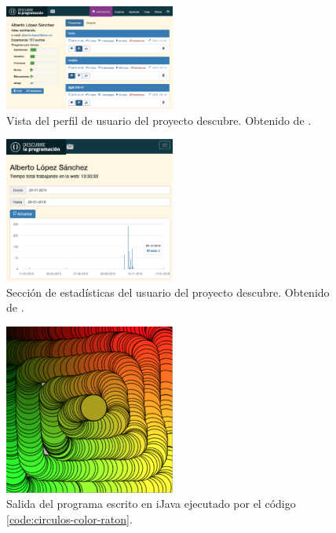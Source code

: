 \begin{figure}[!ht]
	\begin{centering}
		\includegraphics[width=0.5\textwidth]{images/descubre-profile.png}
				\caption{Vista del perfil de usuario del proyecto \Gls{descubre}. Obtenido de \cite{descubre}.}
				\label{fig:descubre-perfil}
	\end{centering}
\end{figure}


\begin{figure}[!ht]
	\begin{centering}
		\includegraphics[width=0.5\textwidth]{images/descubre-statistics.png}
				\caption{Sección de estadísticas del usuario del proyecto \Gls{descubre}. Obtenido de \cite{descubre}.}
				\label{fig:descubre-estadisticas}
	\end{centering}
\end{figure}


\begin{figure}[!ht]
	\begin{centering}
		\includegraphics[width=0.5\textwidth]{images/salida-code-circulos-color-raton.png}
			\caption{Salida del programa escrito en iJava ejecutado por el código \ref{code:circulos-color-raton}.}
				\label{fig:salida-code-circulos-color-raton}
	\end{centering}
\end{figure}




